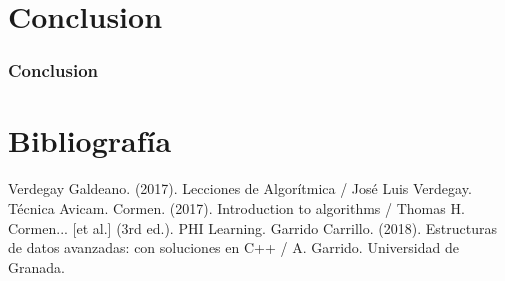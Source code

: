 \documentclass[13pt]{beamer}
\begin{document}
	\section{Conclusion}

    \begin{frame}
		\frametitle{Conclusion}

	\end{frame}


    \section{Bibliografía}

    \begin{frame}
        \begin{thebibliography}{0}
             Verdegay Galdeano. (2017). Lecciones de Algorítmica / José Luis Verdegay. Técnica Avicam.
             Cormen. (2017). Introduction to algorithms / Thomas H. Cormen... [et al.] (3rd ed.). PHI Learning.
             Garrido Carrillo. (2018). Estructuras de datos avanzadas: con soluciones en C++ / A. Garrido. Universidad de Granada.  
        \end{thebibliography}
    \end{frame}
\end{document}

